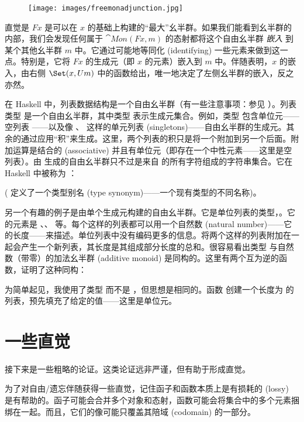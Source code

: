\begin{figure}[H]
  \centering
  \texttt{[image: images/freemonadjunction.jpg]}
\end{figure}

\noindent
直觉是 $F x$ 是可以在 $x$ 的基础上构建的“最大”幺半群。如果我们能看到幺半群的内部，我们会发现任何属于 $\cat{Mon}(F x, m)$ 的态射都将这个自由幺半群 \emph{嵌入} 到某个其他幺半群 $m$ 中。它通过可能地等同化 (identifying) 一些元素来做到这一点。特别是，它将 $F x$ 的生成元（即 $x$ 的元素）嵌入到 $m$ 中。伴随表明，$x$ 的嵌入，由右侧 $\Set(x, U m)$ 中的函数给出，唯一地决定了左侧幺半群的嵌入，反之亦然。

在 Haskell 中，列表数据结构是一个自由幺半群（有一些注意事项：参见 ）。列表类型 \code{{[}a{]}} 是一个自由幺半群，其中类型  表示生成元集合。例如，类型 \code{{[}Char{]}} 包含单位元——空列表 \code{{[}{]}}——以及像 \code{{[}'a'{]}}、\code{{[}'b'{]}} 这样的单元列表 (singletons)——自由幺半群的生成元。其余的通过应用“积”来生成。这里，两个列表的积只是将一个附加到另一个后面。附加运算是结合的 (associative) 并且有单位元（即存在一个中性元素——这里是空列表）。由  生成的自由幺半群只不过是来自  的所有字符组成的字符串集合。它在 Haskell 中被称为 ：

( 定义了一个类型别名 (type synonym)——一个现有类型的不同名称)。

另一个有趣的例子是由单个生成元构建的自由幺半群。它是单位列表的类型，\code{{[}(){]}}。它的元素是 \code{{[}{]}}、\code{{[}(){]}}、\code{{[}(), (){]}} 等。每个这样的列表都可以用一个自然数 (natural number)——它的长度——来描述。单位列表中没有编码更多的信息。将两个这样的列表附加在一起会产生一个新列表，其长度是其组成部分长度的总和。很容易看出类型 \code{{[}(){]}} 与自然数（带零）的加法幺半群 (additive monoid) 是同构的。这里有两个互为逆的函数，证明了这种同构：

为简单起见，我使用了类型  而不是 ，但思想是相同的。函数  创建一个长度为  的列表，预先填充了给定的值——这里是单位元。

\section{一些直觉}

接下来是一些粗略的论证。这类论证远非严谨，但有助于形成直觉。

为了对自由/遗忘伴随获得一些直觉，记住函子和函数本质上是有损耗的 (lossy) 是有帮助的。函子可能会合并多个对象和态射，函数可能会将集合中的多个元素捆绑在一起。而且，它们的像可能只覆盖其陪域 (codomain) 的一部分。

